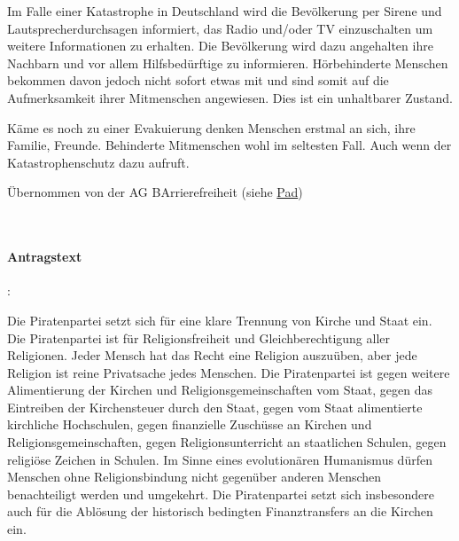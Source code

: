 {Im Falle einer Katastrophe in Deutschland wird die Bevölkerung per Sirene und Lautsprecherdurchsagen informiert, das Radio und/oder TV einzuschalten um weitere Informationen zu erhalten. Die Bevölkerung wird dazu angehalten ihre Nachbarn und vor allem Hilfsbedürftige zu informieren. Hörbehinderte Menschen bekommen davon jedoch nicht sofort etwas mit und sind somit auf die Aufmerksamkeit ihrer Mitmenschen angewiesen. Dies ist ein unhaltbarer Zustand.

Käme es noch zu einer Evakuierung denken Menschen erstmal an sich, ihre Familie, Freunde. Behinderte Mitmenschen wohl im seltesten Fall. Auch wenn der Katastrophenschutz dazu aufruft.


Übernommen von der AG BArrierefreiheit (siehe \href{https://ag_barrierefreiheit.piratenpad.de/4}{Pad}) 
}


\\

\paragraph{Antragstext}:

Die Piratenpartei setzt sich für eine klare Trennung von Kirche und Staat ein. Die Piratenpartei ist für Religionsfreiheit und Gleichberechtigung aller Religionen. Jeder Mensch hat das Recht eine Religion auszuüben, aber jede Religion ist reine Privatsache jedes Menschen. Die Piratenpartei ist gegen weitere Alimentierung der Kirchen und Religionsgemeinschaften vom Staat, gegen das Eintreiben der Kirchensteuer durch den Staat, gegen vom Staat alimentierte kirchliche Hochschulen, gegen finanzielle Zuschüsse an Kirchen und Religionsgemeinschaften, gegen Religionsunterricht an staatlichen Schulen, gegen religiöse Zeichen in Schulen. Im Sinne eines evolutionären Humanismus dürfen Menschen ohne Religionsbindung nicht gegenüber anderen Menschen benachteiligt werden und umgekehrt. Die Piratenpartei setzt sich insbesondere auch für die Ablösung der historisch bedingten Finanztransfers an die Kirchen ein.


